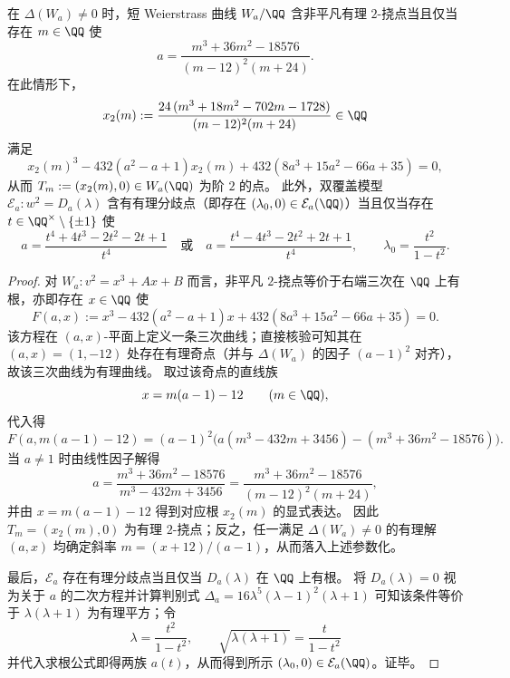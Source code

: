 \begin{conclusion}\label{con:xi-terminal-zm-leyang-spectral-quartic-a-2torsion}
在 \(\Delta(W_a)\neq 0\) 时，短 Weierstrass 曲线 \(W_a/\QQ\) 含非平凡有理 \(2\)-挠点当且仅当存在 \(m\in\QQ\) 使
\[
a=\frac{m^3+36m^2-18576}{(m-12)^2(m+24)}.
\]
在此情形下，
\[
x_2(m):=\frac{24\,(m^3+18m^2-702m-1728)}{(m-12)^2(m+24)}\in\QQ
\]
满足
\[
x_2(m)^3-432(a^2-a+1)x_2(m)+432(8a^3+15a^2-66a+35)=0,
\]
从而 \(T_m:=(x_2(m),0)\in W_a(\QQ)\) 为阶 \(2\) 的点。
此外，双覆盖模型 \(\mathcal E_a:w^2=D_a(\lambda)\) 含有有理分歧点（即存在 \((\lambda_0,0)\in\mathcal E_a(\QQ)\)）当且仅当存在 \(t\in\QQ^\times\setminus\{\pm 1\}\) 使
\[
a=\frac{t^4+4t^3-2t^2-2t+1}{t^4}
\quad\text{或}\quad
a=\frac{t^4-4t^3-2t^2+2t+1}{t^4},
\qquad
\lambda_0=\frac{t^2}{1-t^2}.
\]
\end{conclusion}
\begin{proof}
对 \(W_a:v^2=x^3+Ax+B\) 而言，非平凡 \(2\)-挠点等价于右端三次在 \(\QQ\) 上有根，亦即存在 \(x\in\QQ\) 使
\[
F(a,x):=x^3-432(a^2-a+1)x+432(8a^3+15a^2-66a+35)=0.
\]
该方程在 \((a,x)\)-平面上定义一条三次曲线；直接核验可知其在 \((a,x)=(1,-12)\) 处存在有理奇点（并与 \(\Delta(W_a)\) 的因子 \((a-1)^2\) 对齐），故该三次曲线为有理曲线。
取过该奇点的直线族
\[
x=m(a-1)-12\qquad(m\in\QQ),
\]
代入得
\[
F(a,m(a-1)-12)=(a-1)^2\bigl(a(m^3-432m+3456)-(m^3+36m^2-18576)\bigr).
\]
当 \(a\neq 1\) 时由线性因子解得
\[
a=\frac{m^3+36m^2-18576}{m^3-432m+3456}
=\frac{m^3+36m^2-18576}{(m-12)^2(m+24)},
\]
并由 \(x=m(a-1)-12\) 得到对应根 \(x_2(m)\) 的显式表达。
因此 \(T_m=(x_2(m),0)\) 为有理 \(2\)-挠点；反之，任一满足 \(\Delta(W_a)\neq 0\) 的有理解 \((a,x)\) 均确定斜率 \(m=(x+12)/(a-1)\)，从而落入上述参数化。
\par
最后，\(\mathcal E_a\) 存在有理分歧点当且仅当 \(D_a(\lambda)\) 在 \(\QQ\) 上有根。
将 \(D_a(\lambda)=0\) 视为关于 \(a\) 的二次方程并计算判别式
\(
\Delta_a=16\lambda^5(\lambda-1)^2(\lambda+1)
\)
可知该条件等价于 \(\lambda(\lambda+1)\) 为有理平方；令
\[
\lambda=\frac{t^2}{1-t^2},\qquad \sqrt{\lambda(\lambda+1)}=\frac{t}{1-t^2}
\]
并代入求根公式即得两族 \(a(t)\)，从而得到所示 \((\lambda_0,0)\in\mathcal E_a(\QQ)\)。证毕。
\end{proof}

